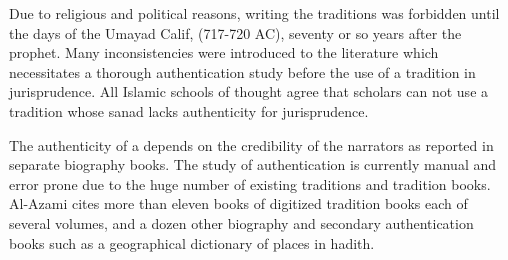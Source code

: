 \documentclass{llncs}
\newcommand{\noArRL}[1]{\arabfalse\RL{#1}\arabtrue}
\begin{document}
Due to religious and political reasons, writing the traditions was forbidden 
until the days of the Umayad Calif,
\novocalize
{}(717-720 AC), seventy or so years after the prophet. 
Many inconsistencies were introduced to the literature which necessitates 
a thorough authentication study before the use of a tradition in jurisprudence.
\vocalize
All Islamic schools of thought agree
that scholars can not use a tradition whose sanad lacks authenticity for jurisprudence.

The authenticity of a \noArRL{.hady_t} depends on 
the credibility of the narrators as reported in 
separate biography books. 
The study of \noArRL{.hady_t} authentication is 
currently manual and error prone due to the huge number
of existing traditions and tradition books. 
Al-Azami\cite{Al-Azami-91} cites more than eleven books
of digitized tradition books each of several volumes, and a dozen
other biography and secondary authentication books such
as a geographical dictionary of places in hadith. 

\end{document}
